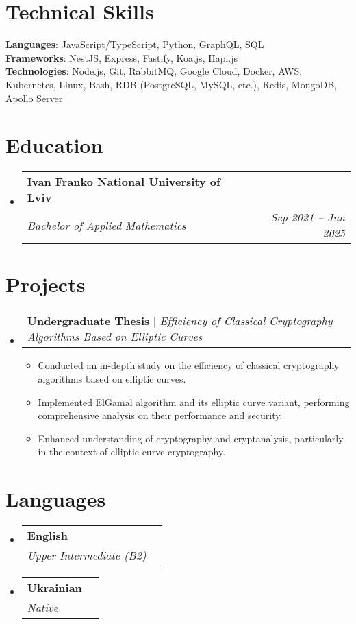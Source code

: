 \documentclass[letterpaper,11pt]{article}
\makeatletter
\newcommand{\resumeItem}[1]{
  \item\small{
    {#1 \vspace{-2pt}}
  }
}
\newcommand{\resumeSubheading}[4]{
  \vspace{-2pt}\item
    \begin{tabular*}{0.97\textwidth}[t]{l@{\extracolsep{\fill}}r}
      \textbf{#1} & #2 \\
      \textit{\small#3} & \textit{\small #4} \\
    \end{tabular*}\vspace{-7pt}
}
\newcommand{\resumeSubHeadingListStart}{\begin{itemize}[leftmargin=0.15in, label={}]}
\newcommand{\resumeSubHeadingListEnd}{\end{itemize}}
\newcommand{\resumeItemListStart}{\begin{itemize}}
\newcommand{\resumeItemListEnd}{\end{itemize}\vspace{-5pt}}
\newcommand{\resumeProjectHeading}[2]{
    \item
    \begin{tabular*}{0.97\textwidth}{l@{\extracolsep{\fill}}r}
      \small#1 & #2 \\
    \end{tabular*}\vspace{5pt}  %
}
\makeatother
\begin{document}
\section{Technical Skills}
 \begin{itemize}[leftmargin=0.15in, label={}]
    \small{\item{
     \textbf{Languages}{: JavaScript/TypeScript, Python, GraphQL, SQL} \\
     \textbf{Frameworks}{: NestJS, Express, Fastify, Koa.js, Hapi.js} \\
     \textbf{Technologies}{: Node.js, Git, RabbitMQ, Google Cloud, Docker, AWS, Kubernetes, Linux, Bash, RDB (PostgreSQL, MySQL, etc.), Redis, MongoDB, Apollo Server} \\
    }}
 \end{itemize}
 
\section{Education}
  \resumeSubHeadingListStart
    \resumeSubheading
      {Ivan Franko National University of Lviv}{}
      {Bachelor of Applied Mathematics} {Sep 2021 -- Jun 2025}
  \resumeSubHeadingListEnd

\section{Projects}
    \resumeSubHeadingListStart
      \resumeProjectHeading
          {\textbf{Undergraduate Thesis} $|$ \emph{Efficiency of Classical Cryptography Algorithms Based on Elliptic Curves}}{}
          \resumeItemListStart
            \resumeItem{Conducted an in-depth study on the efficiency of classical cryptography algorithms based on elliptic curves.}
            \resumeItem{Implemented ElGamal algorithm and its elliptic curve variant, performing comprehensive analysis on their performance and security.}
            \resumeItem{Enhanced understanding of cryptography and cryptanalysis, particularly in the context of elliptic curve cryptography.}
          \resumeItemListEnd
    \resumeSubHeadingListEnd
    
\section{Languages}
  \resumeSubHeadingListStart
    \resumeSubheading
      {English}{}
      {Upper Intermediate (B2)} {}
    \resumeSubheading
      {Ukrainian}{}
      {Native} {}
  \resumeSubHeadingListEnd
  
\end{document}
